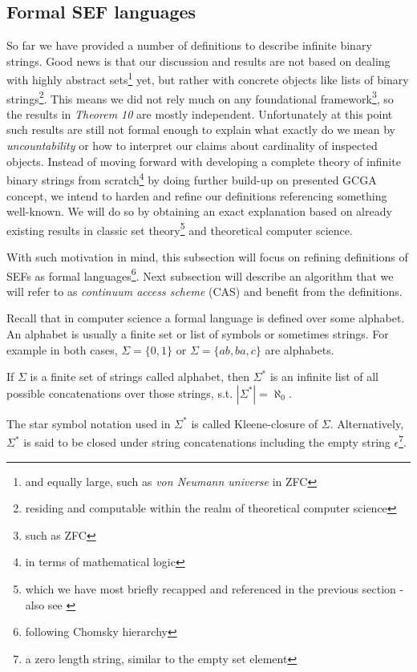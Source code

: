 \subsection{Formal SEF languages}

So far we have provided a number of definitions to describe infinite binary strings. Good news is that our discussion and results are not based on dealing with highly abstract sets\footnote{and equally large, such as \textit{von Neumann universe} in ZFC} yet, but rather with concrete objects like lists of binary strings\footnote{residing and computable within the realm of theoretical computer science}. This means we did not rely much on any foundational framework\footnote{such as ZFC}, so the results in \textit{Theorem 10} are mostly independent. Unfortunately at this point such results are still not formal enough to explain what exactly do we mean by \textit{uncountability} or how to interpret our claims about cardinality of inspected objects. Instead of moving forward with developing a complete theory of infinite binary strings from scratch\footnote{in terms of mathematical logic} by doing further build-up on presented GCGA concept, we intend to harden and refine our definitions referencing something well-known. We will do so by obtaining an exact explanation based on already existing results in classic set theory\footnote{which we have most briefly recapped and referenced in the previous section - also see \cite{goldrei1996classic}} and theoretical computer science\cite{Sipser05introcompther}.

With such motivation in mind, this subsection will focus on refining definitions of SEFs as formal languages\footnote{following Chomsky hierarchy}. Next subsection will describe an algorithm that we will refer to as \textit{continuum access scheme} (CAS) and benefit from the definitions.

Recall that in computer science\cite{Sipser05introcompther} a formal language is defined over some alphabet. An alphabet is usually a finite set or list of symbols or sometimes strings. For example in both cases, $\Sigma=\{0,1\}$ or $\Sigma=\{ab,ba,c\}$ are alphabets.

\begin{definition}
  If $\Sigma$ is a finite set of strings called alphabet, then $\Sigma^*$ is an infinite list of all possible concatenations over those strings, s.t. $|\Sigma^*| = \aleph_0$.
\end{definition}

The star symbol notation used in $\Sigma^*$ is called Kleene-closure of $\Sigma$. Alternatively, $\Sigma^*$ is said to be closed under string concatenations including the empty string $\epsilon$\footnote{a zero length string, similar to the empty set element}.

